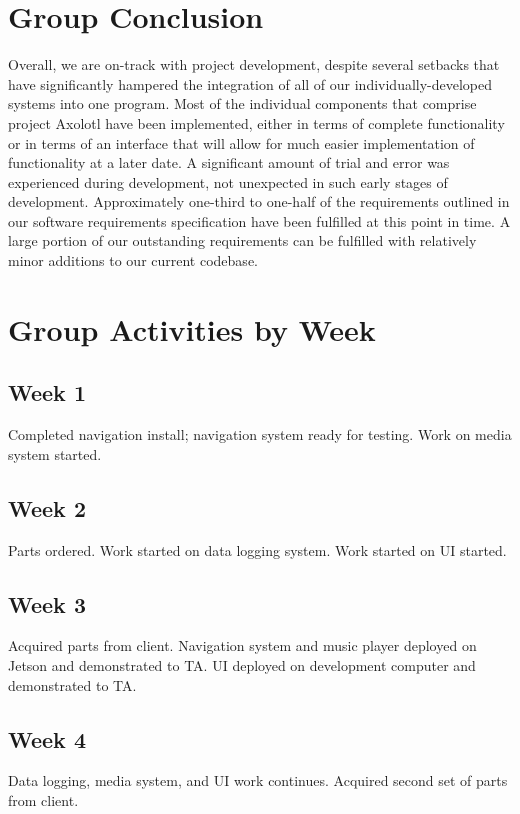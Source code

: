 \documentclass[onecolumn, draftclsnofoot,10pt, compsoc]{IEEEtran}
\begin{document}
\newpage
\section{Group Conclusion}
Overall, we are on-track with project development, despite several setbacks that have significantly hampered the integration of all of our individually-developed systems into one program. Most of the individual components that comprise project Axolotl have been implemented, either in terms of complete functionality or in terms of an interface that will allow for much easier implementation of functionality at a later date. A significant amount of trial and error was experienced during development, not unexpected in such early stages of development. Approximately one-third to one-half of the requirements outlined in our software requirements specification have been fulfilled at this point in time. A large portion of our outstanding requirements can be fulfilled with relatively minor additions to our current codebase.

\newpage
\section{Group Activities by Week}

\subsection{Week 1}
Completed navigation install; navigation system ready for testing. Work on media system started.

\subsection{Week 2}
Parts ordered. Work started on data logging system. Work started on UI started.

\subsection{Week 3}
Acquired parts from client. Navigation system and music player deployed on Jetson and demonstrated to TA. UI deployed on development computer and demonstrated to TA.

\subsection{Week 4}
Data logging, media system, and UI work continues. Acquired second set of parts from client.
\end{document}
